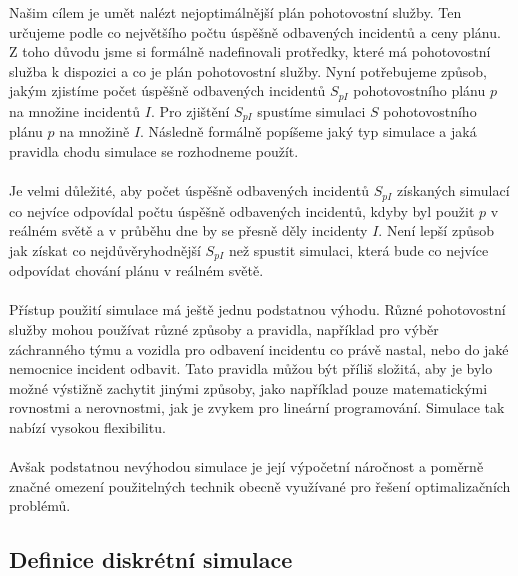 Našim cílem je umět nalézt nejoptimálnější plán pohotovostní služby.
Ten určujeme podle co největšího počtu úspěšně odbavených incidentů a ceny plánu.
Z toho důvodu jsme si formálně nadefinovali protředky, které má pohotovostní služba k dispozici a co je plán pohotovostní služby.
Nyní potřebujeme způsob, jakým zjistíme počet úspěšně odbavených incidentů $S_{pI}$ pohotovostního plánu $p$ na množine incidentů $I$.
Pro zjištění $S_{pI}$ spustíme simulaci $S$ pohotovostního plánu $p$ na množině $I$.
Následně formálně popíšeme jaký typ simulace a jaká pravidla chodu simulace se rozhodneme použít. %
\\
\\
Je velmi důležité, aby počet úspěšně odbavených incidentů $S_{pI}$ získaných simulací co nejvíce odpovídal počtu úspěšně odbavených incidentů,
kdyby byl použit $p$ v reálném světě a v průběhu dne by se přesně děly incidenty $I$.
Není lepší způsob jak získat co nejdůvěryhodnější $S_{pI}$ než spustit simulaci, která bude co nejvíce odpovídat chování plánu v reálném světě.
\\
\\
Přístup použití simulace má ještě jednu podstatnou výhodu.
Různé pohotovostní služby mohou používat různé způsoby a pravidla, například pro výběr záchranného týmu a vozidla pro odbavení incidentu co právě nastal, nebo do jaké nemocnice incident odbavit.
Tato pravidla můžou být příliš složitá, aby je bylo možné výstižně zachytit jinými způsoby, jako například pouze matematickými rovnostmi a nerovnostmi, jak je zvykem pro lineární programování.
Simulace tak nabízí vysokou flexibilitu.
\\
\\
Avšak podstatnou nevýhodou simulace je její výpočetní náročnost a poměrně značné omezení použitelných technik obecně využívané pro řešení optimalizačních problémů. %

\subsection{Definice diskrétní simulace}

